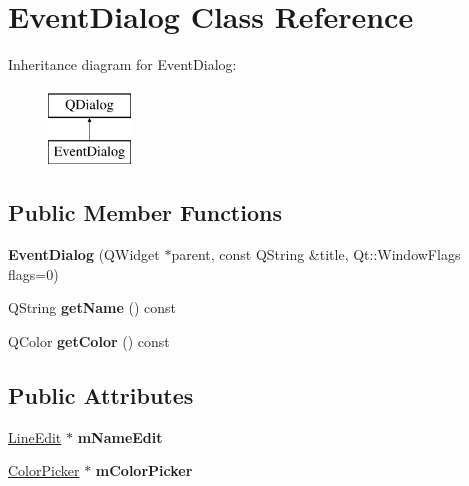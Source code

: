 \hypertarget{class_event_dialog}{\section{Event\-Dialog Class Reference}
\label{class_event_dialog}
}
Inheritance diagram for Event\-Dialog\-:\begin{figure}[H]
\begin{center}
\leavevmode
\includegraphics[height=2.000000cm]{class_event_dialog}
\end{center}
\end{figure}
\subsection*{Public Member Functions}
\begin{DoxyCompactItemize}
\item 
\hypertarget{class_event_dialog_ab90d963a0b8e2c0d6a538e5bcbe26e46}{{\bfseries Event\-Dialog} (Q\-Widget $\ast$parent, const Q\-String \&title, Qt\-::\-Window\-Flags flags=0)}\label{class_event_dialog_ab90d963a0b8e2c0d6a538e5bcbe26e46}

\item 
\hypertarget{class_event_dialog_a5553f9d0a47609ab16da5403be53d491}{Q\-String {\bfseries get\-Name} () const }\label{class_event_dialog_a5553f9d0a47609ab16da5403be53d491}

\item 
\hypertarget{class_event_dialog_aa09e6e0f9d2d0bc3de85d6c4fd57dfa3}{Q\-Color {\bfseries get\-Color} () const }\label{class_event_dialog_aa09e6e0f9d2d0bc3de85d6c4fd57dfa3}

\end{DoxyCompactItemize}
\subsection*{Public Attributes}
\begin{DoxyCompactItemize}
\item 
\hypertarget{class_event_dialog_a53f33766a171e34138ca3d01c005d2a2}{\hyperlink{class_line_edit}{Line\-Edit} $\ast$ {\bfseries m\-Name\-Edit}}\label{class_event_dialog_a53f33766a171e34138ca3d01c005d2a2}

\item 
\hypertarget{class_event_dialog_a9e5b3890a2f5ed2c0d9efb5eb61a8213}{\hyperlink{class_color_picker}{Color\-Picker} $\ast$ {\bfseries m\-Color\-Picker}}\label{class_event_dialog_a9e5b3890a2f5ed2c0d9efb5eb61a8213}

\end{DoxyCompactItemize}


